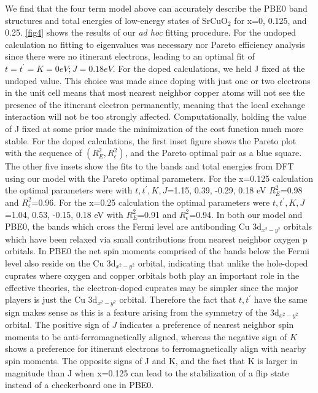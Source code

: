\documentclass{article}
\begin{document}
We find that the four term model above can accurately describe the PBE0 band structures and total energies of low-energy states of SrCuO$_2$ for x=0, 0.125, and 0.25. 
\ref{fig4} shows the results of our \textit{ad hoc} fitting procedure. For the undoped calculation no fitting to eigenvalues was necessary nor Pareto efficiency analysis since there were no itinerant electrons, leading to an optimal fit of $t=t^\prime=K=0 eV; J = 0.18 eV$. 
For the doped calculations, we held J fixed at the undoped value. 
This choice was made since doping with just one or two electrons in the unit cell means that most nearest neighbor copper atoms will not see the presence of the itinerant electron permanently, meaning that the local exchange interaction will not be too strongly affected.
Computationally, holding the value of J fixed at some prior made the minimization of the cost function much more stable. 
For the doped calculations, the first inset figure shows the Pareto plot with the sequence of $(R^2_E, R^2_\epsilon)$, and the Pareto optimal pair as a blue square. 
The other five insets show the fits to the bands and total energies from DFT using our model with the Pareto optimal parameters. 
For the x=0.125 calculation the optimal parameters were with $t,t^\prime,K,J$=1.15, 0.39, -0.29, 0.18 eV $R^2_E$=0.98 and $R^2_\epsilon$=0.96. 
For the x=0.25 calculation the optimal parameters were $t,t^\prime,K,J$=1.04, 0.53, -0.15, 0.18 eV with $R^2_E$=0.91 and $R^2_\epsilon$=0.94. 
In both our model and PBE0, the bands which cross the Fermi level are antibonding Cu 3d$_{x^2-y^2}$ orbitals which have been relaxed via small contributions from nearest neighbor oxygen p orbitals. 
In PBE0 the net spin moments comprised of the bands below the Fermi level also reside on the Cu 3d$_{x^2-y^2}$ orbital, indicating that unlike the hole-doped cuprates where oxygen and copper orbitals both play an important role in the effective theories, the electron-doped cuprates may be simpler since the major players is just the Cu 3d$_{x^2-y^2}$ orbital. 
Therefore the fact that $t, t^\prime$ have the same sign makes sense as this is a feature arising from the symmetry of the 3d$_{x^2-y^2}$ orbital. 
The positive sign of $J$ indicates a preference of nearest neighbor spin moments to be anti-ferromagnetically aligned, whereas the negative sign of $K$ shows a preference for itinerant electrons to ferromagnetically align with nearby spin moments. 
The opposite signs of J and K, and the fact that K is larger in magnitude than J when x=0.125 can lead to the stabilization of a flip state instead of a checkerboard one in PBE0. 
\end{document}
